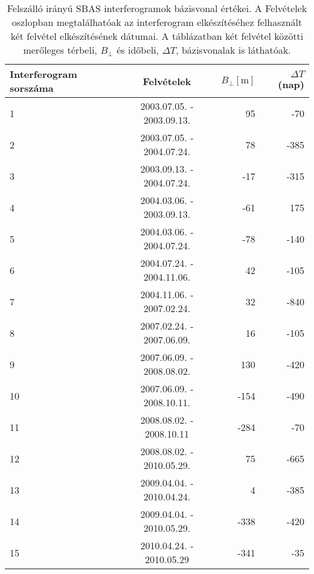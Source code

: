 \documentclass[12pt]{report}
\numberwithin{equation}{section}
\numberwithin{table}{section}
\numberwithin{figure}{section}
\begin{document}
\begin{table}[H]
    \begin{center}
        \begin{tabular}{p{2cm} c r r} \toprule
            Interferogram sorszáma & Felvételek & $B_{\perp} [\si{\meter}]$ & $\Delta T$ (nap) \\ \midrule
            1 & 2003.07.05. - 2003.09.13. & 95 & -70 \\
            2 & 2003.07.05. - 2004.07.24. & 78 & -385 \\
            3 & 2003.09.13. - 2004.07.24. & -17 & -315 \\
            4 & 2004.03.06. - 2003.09.13. & -61 & 175 \\
            5 & 2004.03.06. - 2004.07.24. & -78 & -140 \\
            6 & 2004.07.24. - 2004.11.06. &  42 & -105 \\
            7 & 2004.11.06. - 2007.02.24. &  32 & -840 \\
            8 & 2007.02.24. - 2007.06.09. &  16 & -105 \\
            9 & 2007.06.09. - 2008.08.02. & 130 & -420 \\
            10 & 2007.06.09. - 2008.10.11. & -154 & -490 \\
            11 & 2008.08.02. - 2008.10.11 & -284 &  -70 \\
            12 & 2008.08.02. - 2010.05.29. & 75 & -665 \\
            13 & 2009.04.04. - 2010.04.24. & 4 & -385 \\
            14 & 2009.04.04. - 2010.05.29. & -338 & -420 \\
            15 & 2010.04.24. - 2010.05.29 & -341 & -35 \\ \bottomrule
        \end{tabular}
        \caption{Felszálló irányú SBAS interferogramok bázisvonal értékei. A Felvételek oszlopban megtalálhatóak az interferogram elkészítéséhez felhasznált két felvétel elkészítésének dátumai. A táblázatban két felvétel közötti merőleges térbeli, $B_{\perp}$ és időbeli, $\Delta T$, bázisvonalak is láthatóak. }\label{sbas_asc}
    \end{center}
\end{table}
\end{document}
